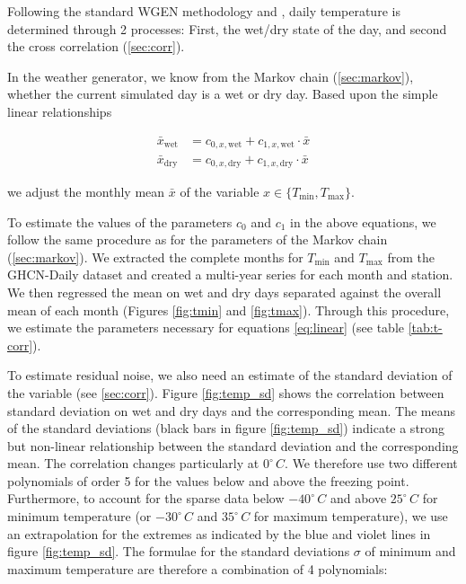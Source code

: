 \begin{refsection}
Following the standard WGEN methodology \citep{Richardson1981} and \cite{GengDevriesSupit1986}, daily temperature is determined through 2 processes: First, the wet/dry state of the day, and second the cross correlation (\autoref{sec:corr}).

In the weather generator, we know from the Markov chain (\autoref{sec:markov}), whether the current simulated day is a wet or dry day. Based upon the simple linear relationships

\begin{align}
\bar{x}_\mathrm{wet} &= c_{0, x, \mathrm{wet}} + c_{1, x, \mathrm{wet}} \cdot \bar{x} \nonumber \\
\bar{x}_\mathrm{dry} &= c_{0, x, \mathrm{dry}} + c_{1, x, \mathrm{dry}} \cdot \bar{x} \label{eq:linear}
\end{align}

we adjust the monthly mean $\bar{x}$ of the variable $x\in\{T_\mathrm{min}, T_\mathrm{max}\}$. 

To estimate the values of the parameters $c_0$ and $c_1$ in the above equations, we follow the same procedure as for the parameters of the Markov chain (\autoref{sec:markov}). We extracted the complete months for $T_\mathrm{min}$ and $T_\mathrm{max}$ from the GHCN-Daily dataset and created a multi-year series for each month and station. We then regressed the mean on wet and dry days separated against the overall mean of each month (Figures \ref{fig:tmin} and \ref{fig:tmax}). Through this procedure, we estimate the parameters necessary for equations \eqref{eq:linear} (see table \ref{tab:t-corr}).

To estimate residual noise, we also need an estimate of the standard deviation of the variable (see \autoref{sec:corr}). Figure \ref{fig:temp_sd} shows the correlation between standard deviation on wet and dry days and the corresponding mean. The means of the standard deviations (black bars in figure \ref{fig:temp_sd}) indicate a strong but non-linear relationship between the standard deviation and the corresponding mean. The correlation changes particularly at $0^\circ\, C$. We therefore use two different polynomials of order 5 for the values below and above the freezing point. Furthermore, to account for the sparse data below $-40^\circ\, C$  and above $25^\circ\, C$ for minimum temperature (or $-30^\circ\, C$ and $35^\circ\, C$ for maximum temperature), we use an extrapolation for the extremes as indicated by the blue and violet lines in figure \ref{fig:temp_sd}. The formulae for the standard deviations $\sigma$ of minimum and maximum temperature are therefore a combination of 4 polynomials:


\end{refsection}
